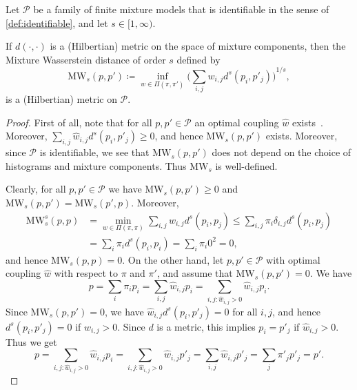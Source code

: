 \documentclass{article}
\begin{document}
\begin{theorem}
    Let $\mathcal{P}$ be a family of finite mixture models that is
    identifiable in the sense of \cref{def:identifiable}, and let $s \in [1, \infty)$.

    If $d(\cdot, \cdot)$ is a (Hilbertian) metric on the space of mixture components, then
    the Mixture Wasserstein distance of order $s$ defined by
    \begin{equation}\label{eq:mixture_distance}
        \mathrm{MW}_s(p, p') \coloneqq \inf_{w \in \Pi(\pi, \pi')} {\bigg(\sum_{i,j} w_{i,j} d^s(p_i, p'_j)\bigg)}^{1/s},
    \end{equation}
    is a (Hilbertian) metric on $\mathcal{P}$.
\end{theorem}

\begin{proof}
    First of all, note that for all $p, p' \in \mathcal{P}$ an optimal
    coupling $\hat{w}$ exists~\citep[Theorem~4.1]{Villani2009}. Moreover,
    $\sum_{i,j} \hat{w}_{i,j} d^s(p_i, p'_j) \geq 0$, and hence $\mathrm{MW}_s(p, p')$ exists.
    Moreover, since $\mathcal{P}$ is identifiable, we see that $\mathrm{MW}_s(p, p')$ does not
    depend on the choice of histograms and mixture components. Thus $\mathrm{MW}_s$ is well-defined.

    Clearly, for all $p, p' \in \mathcal{P}$ we have $\mathrm{MW}_s(p, p') \geq 0$ and
    $\mathrm{MW}_s(p, p') = \mathrm{MW}_s(p', p)$. Moreover,
    \begin{equation*}
        \begin{split}
            \mathrm{MW}_s^s(p, p) &= \min_{w \in \Pi(\pi, \pi)} \sum_{i,j} w_{i,j} d^s(p_i, p_j)
            \leq \sum_{i,j} \pi_i \delta_{i,j} d^s(p_i, p_j) \\
            &= \sum_i \pi_i d^s(p_i, p_i) = \sum_i \pi_i 0^2 = 0,
        \end{split}
    \end{equation*}
    and hence $\mathrm{MW}_s(p, p) = 0$. On the other hand, let $p, p' \in \mathcal{P}$ with
    optimal coupling $\hat{w}$ with respect to $\pi$ and $\pi'$, and assume that
    $\mathrm{MW}_s(p, p') = 0$. We have
    \begin{equation*}
        p = \sum_i \pi_i p_i = \sum_{i,j} \hat{w}_{i,j} p_i = \sum_{i,j \colon \hat{w}_{i,j} > 0} \hat{w}_{i,j} p_i.
    \end{equation*}
    Since $\mathrm{MW}_s(p, p') = 0$, we have $\hat{w}_{i,j} d^s(p_i, p'_j) = 0$ for all $i,j$, 
    and hence $d^s(p_i, p'_j) = 0$ if $\hat{w}_{i,j} > 0$. Since $d$ is a metric,
    this implies $p_i = p'_j$ if $\hat{w}_{i,j} > 0$. Thus we get
    \begin{equation*}
        p = \sum_{i,j \colon \hat{w}_{i,j} > 0} \hat{w}_{i,j} p_i = \sum_{i,j \colon \hat{w}_{i,j} > 0} \hat{w}_{i,j} p'_j
        = \sum_{i,j} \hat{w}_{i,j} p'_j = \sum_j \pi'_j p'_j = p'.
    \end{equation*}


\end{proof}
\end{document}
